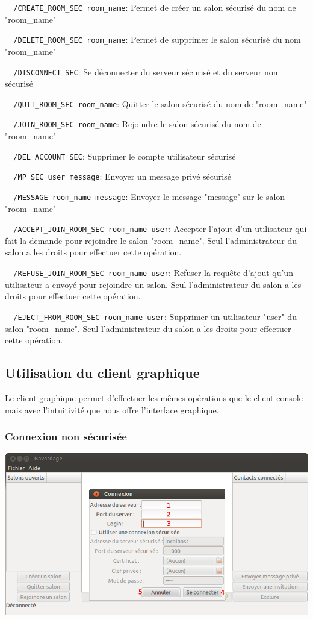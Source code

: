 \documentclass[a4paper,11pt,french]{book}
\begin{document}
\verb+	/CREATE_ROOM_SEC room_name+: Permet de créer un salon sécurisé du nom de "room\_name"

\verb+	/DELETE_ROOM_SEC room_name+: Permet de supprimer le salon sécurisé du nom "room\_name"

\verb+	/DISCONNECT_SEC+: Se déconnecter du serveur sécurisé et du serveur non sécurisé

\verb+	/QUIT_ROOM_SEC room_name+: Quitter le salon sécurisé du nom de "room\_name"

\verb+	/JOIN_ROOM_SEC room_name+: Rejoindre le salon sécurisé du nom de "room\_name"

\verb+	/DEL_ACCOUNT_SEC+: Supprimer le compte utilisateur sécurisé

\verb+	/MP_SEC user message+: Envoyer un message privé sécurisé

\verb+	/MESSAGE room_name message+: Envoyer le message "message" sur le salon "room\_name"

\verb+	/ACCEPT_JOIN_ROOM_SEC room_name user+: Accepter l'ajout d'un utilisateur qui fait la demande pour rejoindre le salon "room\_name". Seul l'administrateur du salon a les droits pour effectuer cette opération.

\verb+	/REFUSE_JOIN_ROOM_SEC room_name user+: Refuser la requête d'ajout qu'un utilisateur a envoyé pour rejoindre un salon. Seul l'administrateur du salon a les droits pour effectuer cette opération.

\verb+	/EJECT_FROM_ROOM_SEC room_name user+: Supprimer un utilisateur "user" du salon "room\_name". Seul l'administrateur du salon a les droits pour effectuer cette opération.


\subsection{Utilisation du client graphique}

Le client graphique permet d'effectuer les mêmes opérations que le client console mais avec l'intuitivité que nous offre l'interface graphique.

\subsubsection{Connexion non sécurisée}
\includegraphics[width=40em]{capture/con_n_sec.png}
\end{document}
